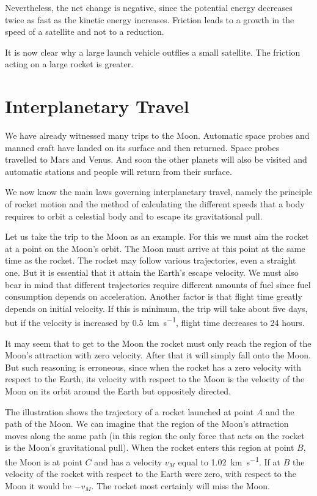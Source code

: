 Nevertheless, the net change is negative, since the
potential energy decreases twice as fast as the kinetic
energy increases. Friction leads to a growth in the speed
of a satellite and not to a reduction.

It is now clear why a large launch vehicle outflies a small
satellite. The friction acting on a large rocket is greater.

\section{Interplanetary Travel}

We have already witnessed many trips to the Moon.
Automatic space probes and manned craft have landed
on its surface and then returned. Space probes travelled
to Mars and Venus. And soon the other planets will also
be visited and automatic stations and people will return
from their surface.

We now know the main laws governing interplanetary
travel, namely the principle of rocket motion and the
method of calculating the different speeds that a body
requires to orbit a celestial body and to escape its gravitational pull.

Let us take the trip to the Moon as an example. For
this we must aim the rocket at a point on the Moon's
orbit. The Moon must arrive at this point at the same
time as the rocket. The rocket may follow various trajectories, even a straight one. But it is essential that it
attain the Earth's escape velocity. We must also bear
in mind that different trajectories require different
amounts of fuel since fuel consumption depends on acceleration. Another factor is that flight time greatly depends
on initial velocity. If this is minimum, the trip will take
about five days, but if the velocity is increased by \SI{0.5}{\kilo\meter\per\second},
flight time decreases to 24 hours.

It may seem that to get to the Moon the rocket must
only reach the region of the Moon's attraction with zero
velocity. After that it will simply fall onto the Moon.
But such reasoning is erroneous, since when the rocket
has a zero velocity with respect to the Earth, its velocity
with respect to the Moon is the velocity of the Moon on its
orbit around the Earth but oppositely directed.

The illustration  shows the trajectory of a rocket launched at
point $A$ and the path of the Moon. We can imagine that
the region of the Moon's attraction moves along the same
path (in this region the only force that acts on the rocket
is the Moon's gravitational pull). When the rocket enters
this region at point $B$, the Moon is at point $C$ and has
a velocity $v_{M}$ equal to \SI{1.02}{\kilo\meter\per\second}. If at $B$ the velocity
of the rocket with respect to the Earth were zero, with
respect to the Moon it would be $-v_{M}$. The rocket most
certainly will miss the Moon.

